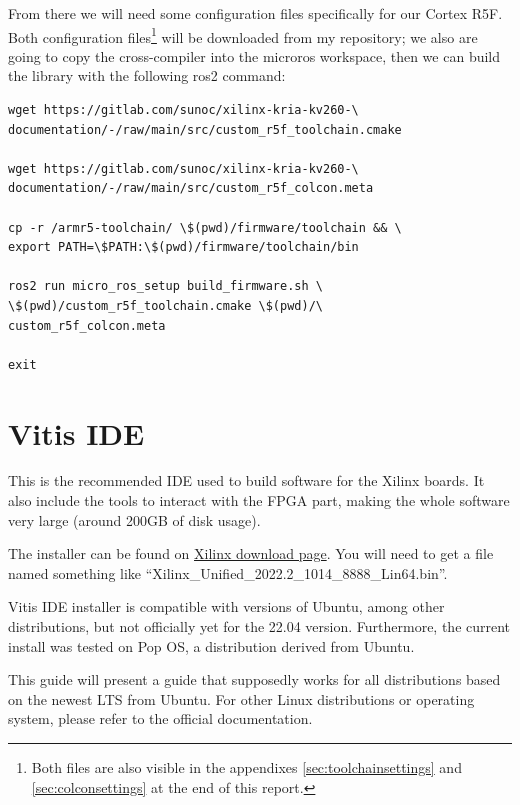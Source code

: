 \documentclass[10pt]{article}
\begin{document}
From there we will need some configuration files specifically for
our Cortex R5F. Both configuration files\footnote{Both files are also visible in the appendixes \ref{sec:toolchainsettings} and \ref{sec:colconsettings} at the end of this report.} will be downloaded from my repository;
we also are going to copy the cross-compiler into the microros workspace,
then we can build the library with the following ros2 command:
\begin{tcolorbox}
\begin{verbatim}
wget https://gitlab.com/sunoc/xilinx-kria-kv260-\
documentation/-/raw/main/src/custom_r5f_toolchain.cmake

wget https://gitlab.com/sunoc/xilinx-kria-kv260-\
documentation/-/raw/main/src/custom_r5f_colcon.meta

cp -r /armr5-toolchain/ \$(pwd)/firmware/toolchain && \
export PATH=\$PATH:\$(pwd)/firmware/toolchain/bin

ros2 run micro_ros_setup build_firmware.sh \
\$(pwd)/custom_r5f_toolchain.cmake \$(pwd)/\
custom_r5f_colcon.meta

exit

\end{verbatim}
\end{tcolorbox}

\section{Vitis IDE}
This is the recommended IDE used to build software for the Xilinx boards.
It also include the tools to interact with the FPGA part, making the whole
software very large (around 200GB of disk usage).

The installer can be found on \href{https://www.xilinx.com/support/download/index.html/content/xilinx/en/downloadNav/vitis.html}{Xilinx download page}. You will need to get
a file named something like ``Xilinx\_Unified\_2022.2\_1014\_8888\_Lin64.bin''.

Vitis IDE installer is compatible with versions of Ubuntu, among other distributions,
but not officially yet for the 22.04 version.
Furthermore, the current install was tested on Pop OS, a distribution derived from Ubuntu.

This guide will present a guide that supposedly works for all distributions based on the newest
LTS from Ubuntu. For other Linux distributions or operating system, please refer to the official documentation.
\end{document}
